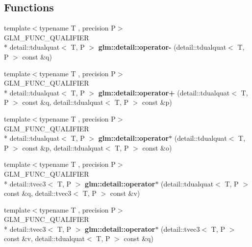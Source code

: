\subsection*{Functions}
\begin{DoxyCompactItemize}
\item 
\hypertarget{namespaceglm_1_1detail_ac0769b92455a8ce14af1079732197e93}{{\footnotesize template$<$typename T , precision P$>$ }\\G\-L\-M\-\_\-\-F\-U\-N\-C\-\_\-\-Q\-U\-A\-L\-I\-F\-I\-E\-R \\*
detail\-::tdualquat$<$ T, P $>$ {\bfseries glm\-::detail\-::operator-\/} (detail\-::tdualquat$<$ T, P $>$ const \&q)}\label{namespaceglm_1_1detail_ac0769b92455a8ce14af1079732197e93}

\item 
\hypertarget{namespaceglm_1_1detail_a5736e2e9b7b856b68da0042a2d80595e}{{\footnotesize template$<$typename T , precision P$>$ }\\G\-L\-M\-\_\-\-F\-U\-N\-C\-\_\-\-Q\-U\-A\-L\-I\-F\-I\-E\-R \\*
detail\-::tdualquat$<$ T, P $>$ {\bfseries glm\-::detail\-::operator+} (detail\-::tdualquat$<$ T, P $>$ const \&q, detail\-::tdualquat$<$ T, P $>$ const \&p)}\label{namespaceglm_1_1detail_a5736e2e9b7b856b68da0042a2d80595e}

\item 
\hypertarget{namespaceglm_1_1detail_a90cb650dadb13bab9ce166e26101afec}{{\footnotesize template$<$typename T , precision P$>$ }\\G\-L\-M\-\_\-\-F\-U\-N\-C\-\_\-\-Q\-U\-A\-L\-I\-F\-I\-E\-R \\*
detail\-::tdualquat$<$ T, P $>$ {\bfseries glm\-::detail\-::operator$\ast$} (detail\-::tdualquat$<$ T, P $>$ const \&p, detail\-::tdualquat$<$ T, P $>$ const \&o)}\label{namespaceglm_1_1detail_a90cb650dadb13bab9ce166e26101afec}

\item 
\hypertarget{namespaceglm_1_1detail_a6e71d3a7488f0259ece91fe7c40f18e7}{{\footnotesize template$<$typename T , precision P$>$ }\\G\-L\-M\-\_\-\-F\-U\-N\-C\-\_\-\-Q\-U\-A\-L\-I\-F\-I\-E\-R \\*
detail\-::tvec3$<$ T, P $>$ {\bfseries glm\-::detail\-::operator$\ast$} (detail\-::tdualquat$<$ T, P $>$ const \&q, detail\-::tvec3$<$ T, P $>$ const \&v)}\label{namespaceglm_1_1detail_a6e71d3a7488f0259ece91fe7c40f18e7}

\item 
\hypertarget{namespaceglm_1_1detail_a31e9bd1f164b5042e0bb0dddfb5d0d29}{{\footnotesize template$<$typename T , precision P$>$ }\\G\-L\-M\-\_\-\-F\-U\-N\-C\-\_\-\-Q\-U\-A\-L\-I\-F\-I\-E\-R \\*
detail\-::tvec3$<$ T, P $>$ {\bfseries glm\-::detail\-::operator$\ast$} (detail\-::tvec3$<$ T, P $>$ const \&v, detail\-::tdualquat$<$ T, P $>$ const \&q)}\label{namespaceglm_1_1detail_a31e9bd1f164b5042e0bb0dddfb5d0d29}


\end{DoxyCompactItemize}
